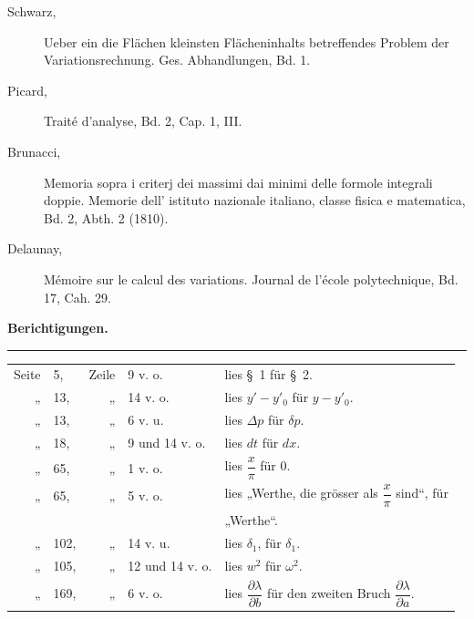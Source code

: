 \documentclass[11pt,a4paper,leqno]{article}
\begin{document}
\begin{description}
\item[Schwarz,] Ueber ein die Flächen kleinsten Flächeninhalts betreffendes
Problem der Variationsrechnung. Ges. Abhandlungen, Bd. 1.

\item[Picard,] Traité d'analyse, Bd. 2, Cap. 1, III.

\item[Brunacci,] Memoria sopra i criterj dei massimi dai minimi delle formole
integrali doppie. Memorie dell' istituto nazionale italiano, classe fisica e
matematica, Bd. 2, Abth. 2 (1810).

\item[Delaunay,] Mémoire sur le calcul des variations. Journal de l'école
polytechnique, Bd. 17, Cah. 29.
\end{description}



\begin{center}
{\Large\bfseries Berichtigungen.}

\rule{1.8cm}{0.4pt}
\end{center}

\begin{tabular}{@{}r@{\ }l@{\ }r@{\ }l@{\ }l@{}}
Seite & 5,   & Zeile & 9 v. o.       & lies \S~1 für \S~2.\\
„     & 13,  & „     & 14 v. o.      & lies $y'-y'_0$ für $y-y'_0$.\\
„     & 13,  & „     & 6 v. u.       & lies $\Delta p$ für $\delta p$.\\
„     & 18,  & „     & 9 und 14 v. o.& lies $dt$ für $dx$.\\
„     & 65,  & „     & 1 v. o.       & lies $\dfrac{x}{\pi}$ für 0.\\
„     & 65,  & „     & 5 v. o.       & lies „Werthe, die grösser als $\dfrac{x}{\pi}$ sind“, für\\
      &      &       &               & „Werthe“.\\
„     & 102, & „     & 14 v. u.      & lies $\delta_1$, für $\delta_1$.\\
„     & 105, & „     & 12 und 14 v. o.& lies $w^2$ für $\omega^2$.\\
„     & 169, & „     & 6 v. o.       & lies $\dfrac{\partial\lambda}{\partial b}$ für den zweiten Bruch
                                           $\dfrac{\partial\lambda}{\partial a}$.\\
\end{tabular}
\end{document}
